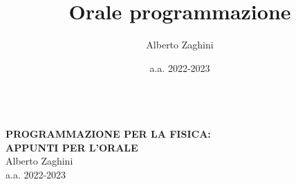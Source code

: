 \documentclass[10pt, oneside]{book}
\title{Orale programmazione}
\author{Alberto Zaghini}
\date{a.a. 2022-2023}
\begin{document}
\makeatletter
\begin{titlepage}
\vspace{-2.1cm}
\hspace{0cm}
\vfill
\color{white}
\, \\\larger[20]\textsf{\textbf{PROGRAMMAZIONE PER LA FISICA:\\APPUNTI PER L'ORALE}}
\\\smaller[2]Alberto Zaghini
\\a.a. 2022-2023
\\~\\ \larger[20]\,\,
\\~\\ \,\,

\vfill
\hspace{0cm}
\end{titlepage}
\makeatother
\end{document}
